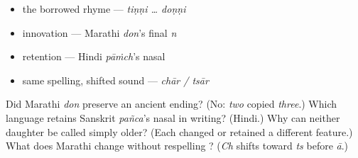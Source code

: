 \begin{itemize}
\raggedright
  \item the borrowed rhyme — \emph{tiṇṇi … doṇṇi}
  \item innovation — Marathi \emph{don}'s final \emph{n}
  \item retention — Hindi \emph{pāṁch}'s nasal
  \item same spelling, shifted sound — \emph{chār / tsār}
\end{itemize}

\begin{tcolorbox}[breakable,colback=teal!4,colframe=teal!35!black,title={Before you move on}]
Did Marathi \emph{don} preserve an ancient ending? (No: \emph{two} copied \emph{three}.) Which language retains Sanskrit \emph{pañca}'s nasal in writing? (Hindi.) Why can neither daughter be called simply older? (Each changed or retained a different feature.) What does Marathi change without respelling \textbf{}? (\emph{Ch} shifts toward \emph{ts} before \emph{ā}.)
\end{tcolorbox}
